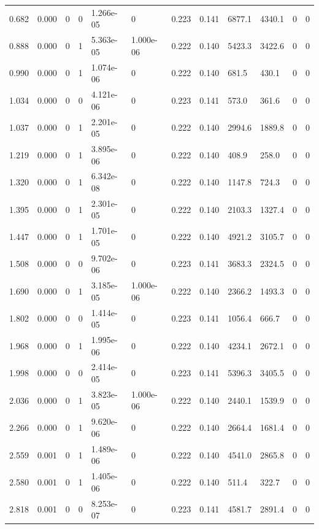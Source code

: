 \documentclass[preview]{standalone}
\begin{document}
{{\begin{tabular}{L{1.2cm}C{1.2cm} C{0.3cm}C{0.5cm} C{1.4cm}C{1.4cm} C{1.4cm}C{1.4cm} C{1.6cm}C{1.6cm} C{1.6cm}C{1.6cm}}
  0.682  &  0.000  & 0     &  0 &  1.266e-05  & 0  &  0.223&   0.141& 6877.1 & 4340.1   &  0 & 0  \\ 
  0.888  &  0.000  & 0     &  1 &  5.363e-05  & 1.000e-06  &  0.222&   0.140& 5423.3 & 3422.6   &  0 & 0  \\ 
  0.990  &  0.000  & 0     &  1 &  1.074e-06  & 0  &  0.222&   0.140& 681.5 & 430.1   &  0 & 0  \\ 
  1.034  &  0.000  & 0     &  0 &  4.121e-06  & 0  &  0.223&   0.141& 573.0 & 361.6   &  0 & 0  \\ 
  1.037  &  0.000  & 0     &  1 &  2.201e-05  & 0  &  0.222&   0.140& 2994.6 & 1889.8   &  0 & 0  \\ 
  1.219  &  0.000  & 0     &  1 &  3.895e-06  & 0  &  0.222&   0.140& 408.9 & 258.0   &  0 & 0  \\ 
  1.320  &  0.000  & 0     &  1 &  6.342e-08  & 0  &  0.222&   0.140& 1147.8 & 724.3   &  0 & 0  \\ 
  1.395  &  0.000  & 0     &  1 &  2.301e-05  & 0  &  0.222&   0.140& 2103.3 & 1327.4   &  0 & 0  \\ 
  1.447  &  0.000  & 0     &  1 &  1.701e-05  & 0  &  0.222&   0.140& 4921.2 & 3105.7   &  0 & 0  \\ 
  1.508  &  0.000  & 0     &  0 &  9.702e-06  & 0  &  0.223&   0.141& 3683.3 & 2324.5   &  0 & 0  \\ 
  1.690  &  0.000  & 0     &  1 &  3.185e-05  & 1.000e-06  &  0.222&   0.140& 2366.2 & 1493.3   &  0 & 0  \\ 
  1.802  &  0.000  & 0     &  0 &  1.414e-05  & 0  &  0.223&   0.141& 1056.4 & 666.7   &  0 & 0  \\ 
  1.968  &  0.000  & 0     &  1 &  1.995e-06  & 0  &  0.222&   0.140& 4234.1 & 2672.1   &  0 & 0  \\ 
  1.998  &  0.000  & 0     &  0 &  2.414e-05  & 0  &  0.223&   0.141& 5396.3 & 3405.5   &  0 & 0  \\ 
  2.036  &  0.000  & 0     &  1 &  3.823e-05  & 1.000e-06  &  0.222&   0.140& 2440.1 & 1539.9   &  0 & 0  \\ 
  2.266  &  0.000  & 0     &  1 &  9.620e-06  & 0  &  0.222&   0.140& 2664.4 & 1681.4   &  0 & 0  \\ 
  2.559  &  0.001  & 0     &  1 &  1.489e-06  & 0  &  0.222&   0.140& 4541.0 & 2865.8   &  0 & 0  \\ 
  2.580  &  0.001  & 0     &  1 &  1.405e-06  & 0  &  0.222&   0.140& 511.4 & 322.7   &  0 & 0  \\ 
  2.818  &  0.001  & 0     &  0 &  8.253e-07  & 0  &  0.223&   0.141& 4581.7 & 2891.4   &  0 & 0  \\ 

\end{tabular}}}
\end{document}
